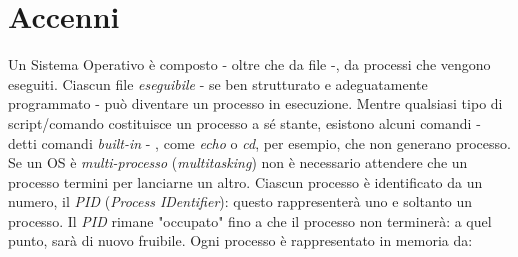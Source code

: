 \section{Accenni}
Un Sistema Operativo è composto - oltre che da file -, da processi che vengono eseguiti.
Ciascun file \textit{eseguibile} - se ben strutturato e adeguatamente programmato - può diventare un processo in esecuzione.
Mentre qualsiasi tipo di script/comando costituisce un processo a sé stante, esistono alcuni comandi - detti comandi \textit{built-in} - , come \textit{echo} o \textit{cd}, per esempio, che non generano processo.
Se un OS è \textit{multi-processo} (\textit{multitasking}) non è necessario attendere che un processo termini per lanciarne un altro.
Ciascun processo è identificato da un numero, il \textit{PID} (\textit{Process IDentifier}): questo rappresenterà uno e soltanto un processo. Il \textit{PID} rimane "occupato" fino a che il processo non terminerà: a quel punto, sarà di nuovo fruibile.
Ogni processo è rappresentato in memoria da:
